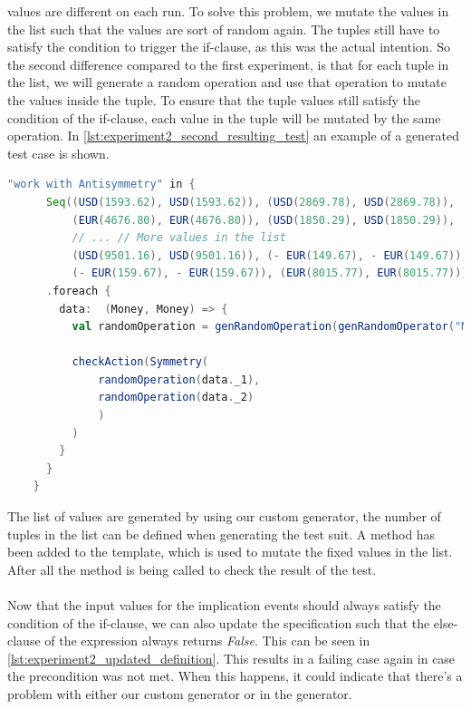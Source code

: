 values are different on each run. To solve this problem, we mutate the values in
the list such that the values are sort of random again. The tuples still have to
satisfy the condition to trigger the if-clause, as this was the actual
intention. So the second difference compared to the first experiment, is that
for each tuple in the list, we will generate a random operation and use that
operation to mutate the values inside the tuple. To ensure that the tuple values
still satisfy the condition of the if-clause, each value in the tuple will be
mutated by the same operation. In
\autoref{lst:experiment2_second_resulting_test} an example of a generated test
case is shown.
\begin{sourcecode}[!ht]
\begin{lstlisting}[language=Scala]
"work with Antisymmetry" in {
      Seq((USD(1593.62), USD(1593.62)), (USD(2869.78), USD(2869.78)),
          (EUR(4676.80), EUR(4676.80)), (USD(1850.29), USD(1850.29)),
          // ... // More values in the list
          (USD(9501.16), USD(9501.16)), (- EUR(149.67), - EUR(149.67)),
          (- EUR(159.67), - EUR(159.67)), (EUR(8015.77), EUR(8015.77)))
      .foreach {
        data:  (Money, Money) => {
          val randomOperation = genRandomOperation(genRandomOperator("Money", true), generateRandomMoney(data._1.currency), generateRandomInteger(true), generateRandomInteger(false), generateRandomPercentage(true), generateRandomPercentage(false), Random.nextInt(10))

          checkAction(Symmetry(
              randomOperation(data._1),
              randomOperation(data._2)
              )
          )
        }
      }
    }
\end{lstlisting}
\caption{Resulting test case with semi-random values. Omitted some input tuples for readability.}
\label{lst:experiment2_second_resulting_test}
\end{sourcecode}
\FloatBarrier\noindent
The list of values are generated by using our custom generator, the number of
tuples in the list can be defined when generating the test suit. A method
 has been added to the template, which is used to
mutate the fixed values in the list. After all the  method
is being called to check the result of the test.\\
\\
Now that the input values for the implication events should always satisfy the
condition of the if-clause, we can also update the specification such that the
else-clause of the expression always returns \textit{False}. This can be seen in
\autoref{lst:experiment2_updated_definition}. This results in a failing case
again in case the precondition was not met. When this happens, it could indicate
that there's a problem with either our custom generator or in the generator.

